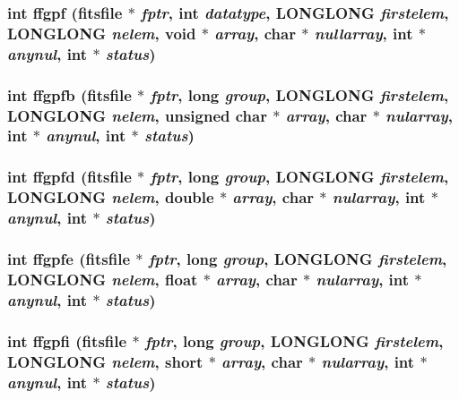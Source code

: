 \subsubsection{\setlength{\rightskip}{0pt plus 5cm}int ffgpf (\bf{fitsfile} $\ast$ {\em fptr}, int {\em datatype}, \bf{LONGLONG} {\em firstelem}, \bf{LONGLONG} {\em nelem}, void $\ast$ {\em array}, char $\ast$ {\em nullarray}, int $\ast$ {\em anynul}, int $\ast$ {\em status})}\label{fitsio_8h_fd98f4b7e140059770ec7fa0396a5b46}


\subsubsection{\setlength{\rightskip}{0pt plus 5cm}int ffgpfb (\bf{fitsfile} $\ast$ {\em fptr}, long {\em group}, \bf{LONGLONG} {\em firstelem}, \bf{LONGLONG} {\em nelem}, unsigned char $\ast$ {\em array}, char $\ast$ {\em nularray}, int $\ast$ {\em anynul}, int $\ast$ {\em status})}\label{fitsio_8h_b3ed324412e62cb24a95691ab0ab7bb1}


\subsubsection{\setlength{\rightskip}{0pt plus 5cm}int ffgpfd (\bf{fitsfile} $\ast$ {\em fptr}, long {\em group}, \bf{LONGLONG} {\em firstelem}, \bf{LONGLONG} {\em nelem}, double $\ast$ {\em array}, char $\ast$ {\em nularray}, int $\ast$ {\em anynul}, int $\ast$ {\em status})}\label{fitsio_8h_f07b2a21749be57deb75f5b64431f653}


\subsubsection{\setlength{\rightskip}{0pt plus 5cm}int ffgpfe (\bf{fitsfile} $\ast$ {\em fptr}, long {\em group}, \bf{LONGLONG} {\em firstelem}, \bf{LONGLONG} {\em nelem}, float $\ast$ {\em array}, char $\ast$ {\em nularray}, int $\ast$ {\em anynul}, int $\ast$ {\em status})}\label{fitsio_8h_1a079011790bd529d65496708911d743}


\subsubsection{\setlength{\rightskip}{0pt plus 5cm}int ffgpfi (\bf{fitsfile} $\ast$ {\em fptr}, long {\em group}, \bf{LONGLONG} {\em firstelem}, \bf{LONGLONG} {\em nelem}, short $\ast$ {\em array}, char $\ast$ {\em nularray}, int $\ast$ {\em anynul}, int $\ast$ {\em status})}\label{fitsio_8h_f29072567714e2050dec2f834a1890c8}


